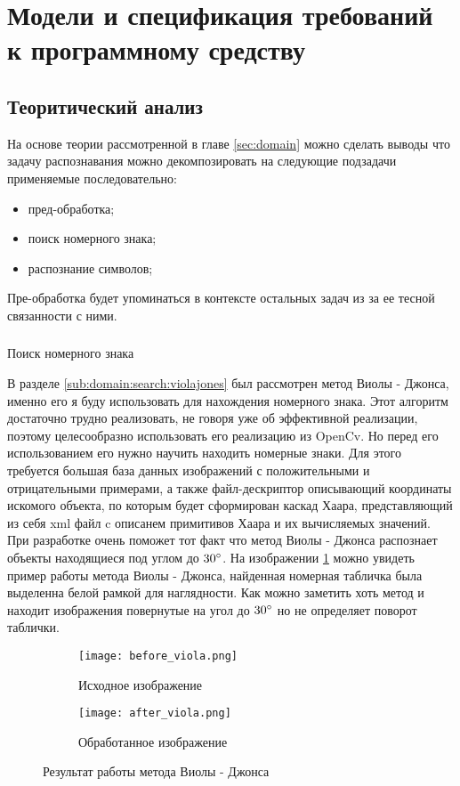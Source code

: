 \section{Модели и спецификация требований к программному средству}
\label{sec:funcreq}

\subsection{Теоритический анализ}

На основе теории рассмотренной в главе \ref{sec:domain} можно сделать выводы что задачу распознавания можно декомпозировать на следующие подзадачи применяемые последовательно:
\begin{itemize}
	\item пред-обработка;
	\item поиск номерного знака;
	\item распознание символов;
\end{itemize} 

Пре-обработка будет упоминаться в контексте остальных задач из за ее тесной связанности с ними.

\subsubsection{}
\label{seq:funcreq:analisys}
Поиск номерного знака

В разделе \ref{sub:domain:search:violajones} был рассмотрен метод Виолы - Джонса, именно его я буду использовать для нахождения номерного знака. Этот алгоритм достаточно трудно реализовать, не говоря уже об эффективной реализации, поэтому целесообразно использовать его реализацию из OpenCv. Но перед его использованием его нужно научить находить номерные знаки. Для этого требуется большая база данных изображений с положительными и отрицательными примерами, а также файл-дескриптор описывающий координаты искомого объекта, по которым будет сформирован каскад Хаара, представляющий из себя xml файл c описанем примитивов Хаара и их вычисляемых значений. При разработке очень поможет тот факт что метод Виолы - Джонса распознает объекты находящиеся под углом до $30\degree$. На изображении \ref{fig:funcreq:analisys:viola} можно увидеть пример работы метода Виолы - Джонса, найденная номерная табличка была выделенна белой рамкой для наглядности. Как можно заметить хоть метод и находит изображения повернутые на угол до $30\degree$ но не определяет поворот таблички. 

\begin{figure}[ht]
\centering
  \begin{subfigure}[b]{0.48\textwidth} 
    \centering
    \texttt{[image: before\_viola.png]}  
    \caption{Исходное изображение}
  \end{subfigure}
  \begin{subfigure}[b]{0.48\textwidth} 
    \centering
    \texttt{[image: after\_viola.png]}  
    \caption{Обработанное изображение}
  \end{subfigure}
  \caption{Результат работы метода Виолы - Джонса}
  \label{fig:funcreq:analisys:viola}
\end{figure}

